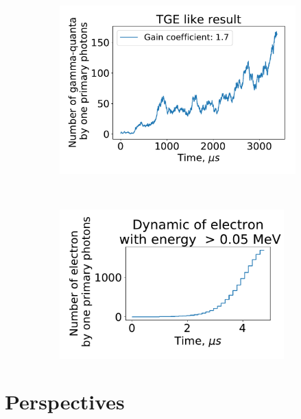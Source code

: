\documentclass[utf8]{webofc}
\begin{document}
\begin{figure}[ht!]
	\begin{subfigure}[b]{0.5\textwidth}
		\includegraphics[width=0.95\linewidth]{figures/proofTGE.pdf}
		\caption{}
		\label{pic-tge-a}
	\end{subfigure}
	~
	\begin{subfigure}[b]{0.5\textwidth}
		\includegraphics[width=0.95\textwidth]{figures/kotlinElectron.pdf}
		\caption{}
		\label{pic-electron-b}
	\end{subfigure}
	\caption{}
\end{figure}

\section{Perspectives}
\end{document}
